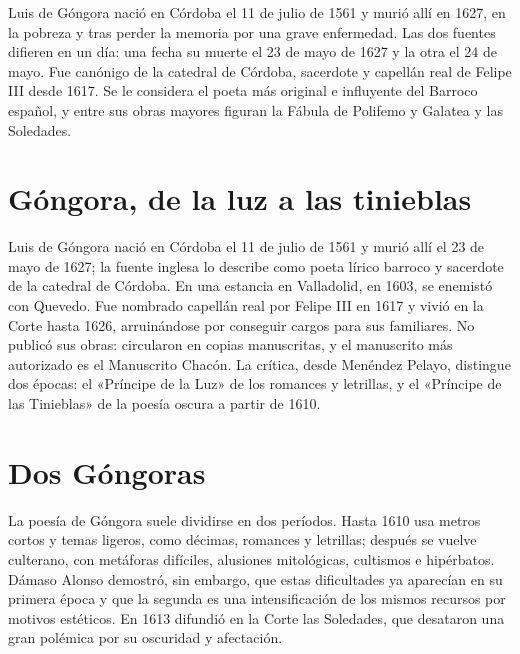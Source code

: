 \documentclass{book}
\begin{document}
Luis de Góngora nació en Córdoba el 11 de julio de 1561 y murió allí en 1627, en la pobreza y tras perder la memoria por una grave enfermedad. Las dos fuentes difieren en un día: una fecha su muerte el 23 de mayo de 1627 y la otra el 24 de mayo. Fue canónigo de la catedral de Córdoba, sacerdote y capellán real de Felipe III desde 1617. Se le considera el poeta más original e influyente del Barroco español, y entre sus obras mayores figuran la Fábula de Polifemo y Galatea y las Soledades.


\section{Góngora, de la luz a las tinieblas}

Luis de Góngora nació en Córdoba el 11 de julio de 1561 y murió allí el 23 de mayo de 1627; la fuente inglesa lo describe como poeta lírico barroco y sacerdote de la catedral de Córdoba. En una estancia en Valladolid, en 1603, se enemistó con Quevedo. Fue nombrado capellán real por Felipe III en 1617 y vivió en la Corte hasta 1626, arruinándose por conseguir cargos para sus familiares. No publicó sus obras: circularon en copias manuscritas, y el manuscrito más autorizado es el Manuscrito Chacón. La crítica, desde Menéndez Pelayo, distingue dos épocas: el «Príncipe de la Luz» de los romances y letrillas, y el «Príncipe de las Tinieblas» de la poesía oscura a partir de 1610.


\section{Dos Góngoras}

La poesía de Góngora suele dividirse en dos períodos. Hasta 1610 usa metros cortos y temas ligeros, como décimas, romances y letrillas; después se vuelve culterano, con metáforas difíciles, alusiones mitológicas, cultismos e hipérbatos. Dámaso Alonso demostró, sin embargo, que estas dificultades ya aparecían en su primera época y que la segunda es una intensificación de los mismos recursos por motivos estéticos. En 1613 difundió en la Corte las Soledades, que desataron una gran polémica por su oscuridad y afectación.
\end{document}
